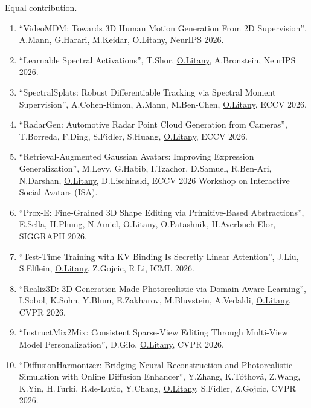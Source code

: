 {\small * Equal contribution.}

\vspace*{.05in}

\begin{enumerate}

\item ``VideoMDM: Towards 3D Human Motion Generation From 2D Supervision'', A.Mann, G.Harari, M.Keidar, \underline{O.Litany}, NeurIPS 2026.

\item ``Learnable Spectral Activations'', T.Shor, \underline{O.Litany}, A.Bronstein, NeurIPS 2026.

\item ``SpectralSplats: Robust Differentiable Tracking via Spectral Moment Supervision'', A.{Cohen-Rimon}, A.Mann, M.Ben-Chen, \underline{O.Litany}, ECCV 2026.

\item ``RadarGen: Automotive Radar Point Cloud Generation from Cameras'', T.Borreda, F.Ding, S.Fidler, S.Huang, \underline{O.Litany}, ECCV 2026.

\item ``Retrieval-Augmented Gaussian Avatars: Improving Expression Generalization'', M.Levy, G.Habib, I.Tzachor, D.Samuel, R.Ben-Ari, N.Darshan, \underline{O.Litany}, D.Lischinski, ECCV 2026 Workshop on Interactive Social Avatars (ISA).

\item ``Prox-E: Fine-Grained 3D Shape Editing via Primitive-Based Abstractions'', E.Sella, H.Phung, N.Amiel, \underline{O.Litany}, O.Patashnik, H.Averbuch-Elor, SIGGRAPH 2026.

\item ``Test-Time Training with KV Binding Is Secretly Linear Attention'', J.Liu, S.Elflein, \underline{O.Litany}, Z.Gojcic, R.Li, ICML 2026.

\item ``{Realiz3D}: {3D} Generation Made Photorealistic via Domain-Aware Learning'', I.Sobol, K.Sohn, Y.Blum, E.Zakharov, M.Bluvstein, A.Vedaldi, \underline{O.Litany}, CVPR 2026.

\item ``InstructMix2Mix: Consistent Sparse-View Editing Through Multi-View Model Personalization'', D.Gilo, \underline{O.Litany}, CVPR 2026.

\item ``DiffusionHarmonizer: Bridging Neural Reconstruction and Photorealistic Simulation with Online Diffusion Enhancer'', Y.Zhang, K.T{\'o}thov{\'a}, Z.Wang, K.Yin, H.Turki, R.de-Lutio, Y.Chang, \underline{O.Litany}, S.Fidler, Z.Gojcic, CVPR 2026.


\end{enumerate}
